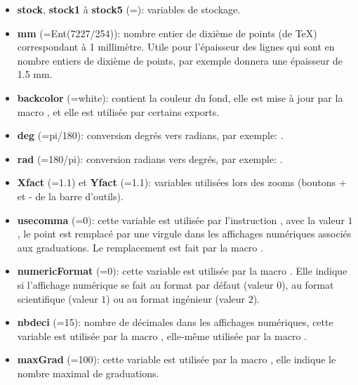 \begin{itemize}
\item \textbf{stock}, \textbf{stock1} à \textbf{stock5} (=\Nil): variables de stockage.

\item \textbf{mm} (=Ent(7227/254)): nombre entier de dixième de points (de TeX) correspondant à 1 millimètre. Utile pour l'épaisseur des lignes qui sont en nombre entiers de dixième de points, par exemple  donnera une épaisseur de 1.5 mm.

\item \textbf{backcolor} (=white): contient la couleur du fond, elle est mise à jour par la macro , et elle est utilisée par certains exports.

\item \textbf{deg} (=pi/180): conversion degrés vers radians, par exemple: .

\item \textbf{rad} (=180/pi): conversion radians vers degrés, par exemple: .

\item \textbf{Xfact} (=1.1) et \textbf{Yfact} (=1.1):  variables utilisées lors des zooms (boutons + et - de la barre d'outils).

\item \textbf{usecomma} (=0): cette variable est utilisée par l'instruction , avec la valeur $1$, le point est remplacé par une virgule dans les affichages numériques associés aux graduations. Le remplacement est fait par la macro .

\item \textbf{numericFormat} (=0): cette variable est utilisée par la macro . Elle indique si l'affichage numérique se fait au format par défaut (valeur $0$), au format scientifique (valeur $1$) ou au format ingénieur (valeur $2$). 
\item \textbf{nbdeci} (=15): nombre de décimales dans les affichages numériques, cette variable est utilisée par la macro , elle-même utilisée par la macro .

\item \textbf{maxGrad} (=100): cette variable est utilisée par la macro , elle indique le nombre maximal de graduations.
\end{itemize}

